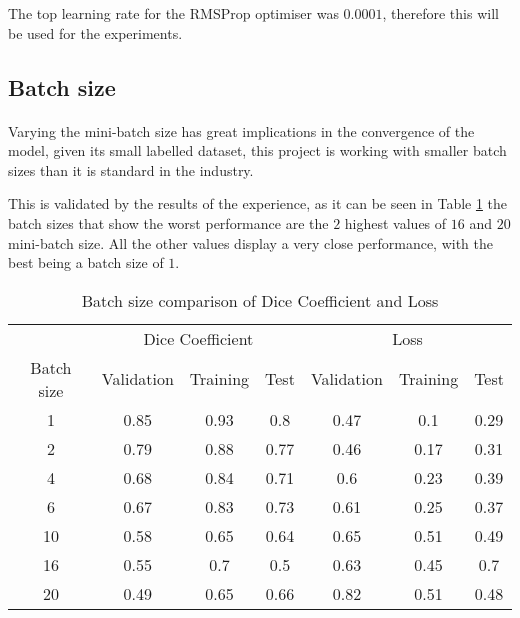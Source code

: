 The top learning rate for the RMSProp optimiser was $0.0001$, therefore this will be used for the experiments.

\subsection{Batch size}
\paragraph{}
Varying the mini-batch size has great implications in the convergence of the model, given its small labelled dataset, this project is working with smaller batch sizes than it is standard in the industry.

This is validated by the results of the experience, as it can be seen in Table \ref{tab_batch} the batch sizes that show the worst performance are the $2$  highest values of $16$ and $20$ mini-batch size. All the other values display a very close performance, with the best being a batch size of $1$.

\begin{table}[ht!] 
    \begin{center}
    \begin{tabular}{ccccccc} 
    \toprule
       & \multicolumn{3}{c}{Dice Coefficient}     & \multicolumn{3}{c}{Loss} \\
    Batch size & Validation & Training & Test & Validation    & Training    & Test   \\ \midrule
    \rowcolor{lightgray} 1 & 0.85 & 0.93 & 0.8 & 0.47 & 0.1 & 0.29  \\ 2 & 0.79 & 0.88 & 0.77 & 0.46 & 0.17 & 0.31  \\ 4 & 0.68 & 0.84 & 0.71 & 0.6 & 0.23 & 0.39  \\ 6 & 0.67 & 0.83 & 0.73 & 0.61 & 0.25 & 0.37  \\ 10 & 0.58 & 0.65 & 0.64 & 0.65 & 0.51 & 0.49  \\ 16 & 0.55 & 0.7 & 0.5 & 0.63 & 0.45 & 0.7  \\ 20 & 0.49 & 0.65 & 0.66 & 0.82 & 0.51 & 0.48  \\

    \bottomrule
    \end{tabular}
  \end{center} 
  \caption{Batch size comparison of Dice Coefficient and Loss}\label{tab_batch}
\end{table}




